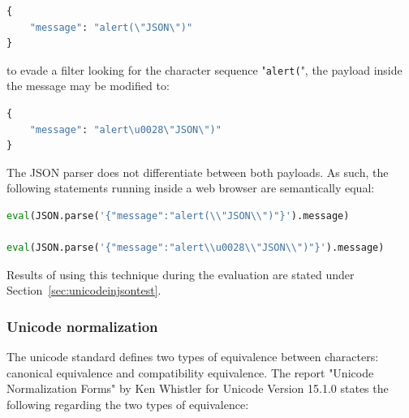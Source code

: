 \begin{lstlisting}[style=basicStyle, language=Python]
{
	"message": "alert(\"JSON\")"
}
\end{lstlisting}

to evade a filter looking for the character sequence "\verb|alert(|", the payload inside the message may be modified to:

\begin{lstlisting}[style=basicStyle, language=Python]
{
	"message": "alert\u0028\"JSON\")"
}
\end{lstlisting}

The JSON parser does not differentiate between both payloads. As such, the following statements running inside a web browser are semantically equal:

\begin{lstlisting}[style=basicStyle, language=Python]
eval(JSON.parse('{"message":"alert(\\"JSON\\")"}').message)

eval(JSON.parse('{"message":"alert\\u0028\\"JSON\\")"}').message)
\end{lstlisting}

Results of using this technique during the evaluation are stated under Section~\ref{sec:unicodeinjsontest}.


\subsubsection{Unicode normalization}
\label{sec:unicodenormalization}
The unicode standard defines two types of equivalence between characters: canonical equivalence and compatibility equivalence. The report "Unicode Normalization Forms" by Ken Whistler for Unicode Version 15.1.0 states the following regarding the two types of equivalence:

